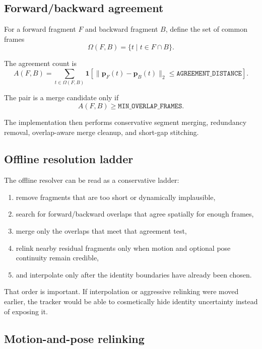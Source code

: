 \documentclass[11pt]{article}
\newcommand{\runtimekey}[1]{\texttt{#1}}
\begin{document}
\subsection{Forward/backward agreement}

For a forward fragment $F$ and backward fragment $B$, define the set of common frames
\begin{equation}
  \Omega(F,B) = \{t \mid t \in F \cap B\}.
\end{equation}

The agreement count is
\begin{equation}
  A(F,B) = \sum_{t \in \Omega(F,B)}
  \mathbf{1}\!\left[\lVert \mathbf{p}_F(t) - \mathbf{p}_B(t) \rVert_2
  \leq \runtimekey{AGREEMENT\_DISTANCE}\right].
\end{equation}

The pair is a merge candidate only if
\begin{equation}
  A(F,B) \geq \runtimekey{MIN\_OVERLAP\_FRAMES}.
\end{equation}

The implementation then performs conservative segment merging, redundancy removal, overlap-aware merge cleanup, and short-gap stitching.

\subsection{Offline resolution ladder}

The offline resolver can be read as a conservative ladder:

\begin{enumerate}
  \item remove fragments that are too short or dynamically implausible,
  \item search for forward/backward overlaps that agree spatially for enough frames,
  \item merge only the overlaps that meet that agreement test,
  \item relink nearby residual fragments only when motion and optional pose continuity remain credible,
  \item and interpolate only after the identity boundaries have already been chosen.
\end{enumerate}

That order is important. If interpolation or aggressive relinking were moved earlier, the tracker would be able to cosmetically hide identity uncertainty instead of exposing it.

\subsection{Motion-and-pose relinking}
\end{document}
